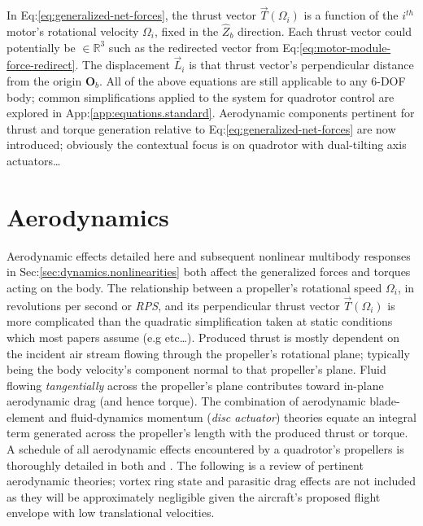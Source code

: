 In Eq:\ref{eq:generalized-net-forces}, the thrust vector $\vec{T}(\Omega_i)$ is a function of the $i^{th}$ motor's rotational velocity $\Omega_i$, fixed in the $\hat{Z}_b$ direction. Each thrust vector could potentially be $\in\mathbb{R}^3$ such as the redirected vector from Eq:\ref{eq:motor-module-force-redirect}. The displacement $\vec{L}_i$ is that thrust vector's perpendicular distance from the origin $\mathbf{O}_b$. All of the above equations are still applicable to any 6-DOF body; common simplifications applied to the system for quadrotor control are explored in App:\ref{app:equations.standard}. Aerodynamic components pertinent for thrust and torque generation relative to Eq:\ref{eq:generalized-net-forces} are now introduced; obviously the contextual focus is on quadrotor with dual-tilting axis actuators\ldots
\section{Aerodynamics}
\label{sec:dynamics.aero}
Aerodynamic effects detailed here and subsequent nonlinear multibody responses in Sec:\ref{sec:dynamics.nonlinearities} both affect the generalized forces and torques acting on the body. The relationship between a propeller's rotational speed $\Omega_i$, in revolutions per second or \emph{RPS}, and its perpendicular thrust vector $\vec{T}(\Omega_i)$ is more complicated than the quadratic simplification taken at static conditions which most papers assume (e.g \cite{x4flyer,modelingquadcopter} etc\ldots). Produced thrust is mostly dependent on the incident air stream flowing through the propeller's rotational plane; typically being the body velocity's component normal to that propeller's plane. Fluid flowing \emph{tangentially} across the propeller's plane contributes toward in-plane aerodynamic drag (and hence torque). The combination of aerodynamic blade-element\cite{bem,forwarddescent} and fluid-dynamics momentum (\emph{disc actuator}) theories equate an integral term generated across the propeller's length with the produced thrust or torque. A schedule of all aerodynamic effects encountered by a quadrotor's propellers is thoroughly detailed in both \cite{bladesforquadrotors} and \cite{nonlineardynamics}. The following is a review of pertinent aerodynamic theories; vortex ring state and parasitic drag effects are not included as they will be approximately negligible given the aircraft's proposed flight envelope with low translational velocities.
